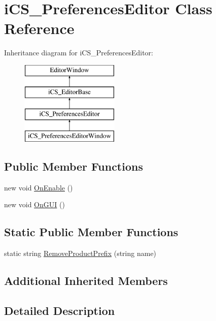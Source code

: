 \hypertarget{classi_c_s___preferences_editor}{\section{i\+C\+S\+\_\+\+Preferences\+Editor Class Reference}
\label{classi_c_s___preferences_editor}
}
Inheritance diagram for i\+C\+S\+\_\+\+Preferences\+Editor\+:\begin{figure}[H]
\begin{center}
\leavevmode
\includegraphics[height=4.000000cm]{classi_c_s___preferences_editor}
\end{center}
\end{figure}
\subsection*{Public Member Functions}
\begin{DoxyCompactItemize}
\item 
new void \hyperlink{classi_c_s___preferences_editor_ad4f3b2e188eab01980cafac7636486ed}{On\+Enable} ()
\item 
new void \hyperlink{classi_c_s___preferences_editor_a54f2170a080bdcfad50929f7b180825b}{On\+G\+U\+I} ()
\end{DoxyCompactItemize}
\subsection*{Static Public Member Functions}
\begin{DoxyCompactItemize}
\item 
static string \hyperlink{classi_c_s___preferences_editor_a6d9edd4e63a04463b755c6a43462ccbb}{Remove\+Product\+Prefix} (string name)
\end{DoxyCompactItemize}
\subsection*{Additional Inherited Members}


\subsection{Detailed Description}


